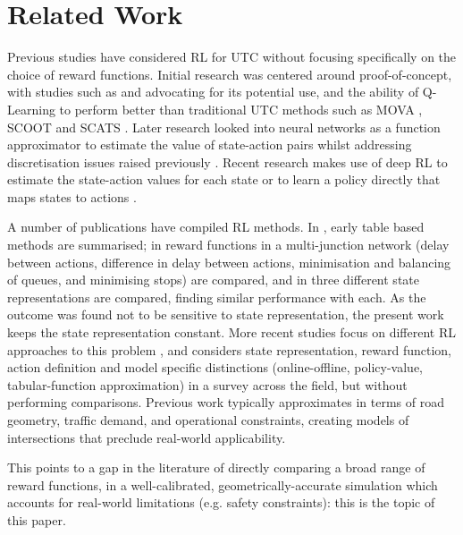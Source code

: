 \documentclass{article}
\begin{document}
\section{Related Work} \label{lit}
Previous studies have considered RL for UTC without focusing specifically on the choice of reward functions.
Initial research was centered around proof-of-concept, with studies such as \cite{wiering2000} and \cite{abdulhai2003} advocating for its potential use, and the ability of Q-Learning to perform better \cite{abdulhai2010} \cite{prashanth2011} than traditional UTC methods such as MOVA \cite{MOVA}, SCOOT \cite{SCOOT} and SCATS \cite{SCATS}. 
Later research looked into neural networks as a function approximator to estimate the value of state-action pairs whilst addressing discretisation issues raised previously \cite{richter2007} \cite{araghi2013}.
Recent research makes use of deep RL to estimate the state-action values for each state \cite{mannion} \cite{vanderpol2016} \cite{genders2016} \cite{gao2017} \cite{wan2018} \cite{liang2018} \cite{zhou2019} or to learn a policy directly that maps states to actions \cite{richter2007} \cite{mousavi2017} \cite{genders2018} \cite{gendersthesis} \cite{aslani2019}.

A number of publications have compiled RL methods. In \cite{rlparam}, early table based methods are summarised; in \cite{mannion} reward functions in a multi-junction network (delay between actions, difference in delay between actions, minimisation and balancing of queues, and minimising stops) are compared, and in \cite{genders2018} three different state representations are compared, finding similar performance with each. As the outcome was found not to be sensitive to state representation, the present work keeps the state representation constant. More recent studies focus on different RL approaches to this problem \cite{yau}, and \cite{wei2019} considers state representation, reward function, action definition and model specific distinctions (online-offline, policy-value, tabular-function approximation) in a survey across the field, but without performing comparisons.
Previous work typically approximates in terms of road geometry, traffic demand, and operational constraints, creating models of intersections that preclude real-world applicability.

This points to a gap in the literature of directly comparing a broad range of reward functions, in a well-calibrated, geometrically-accurate simulation which accounts for real-world limitations (e.g. safety constraints): this is the topic of this paper.
\end{document}
